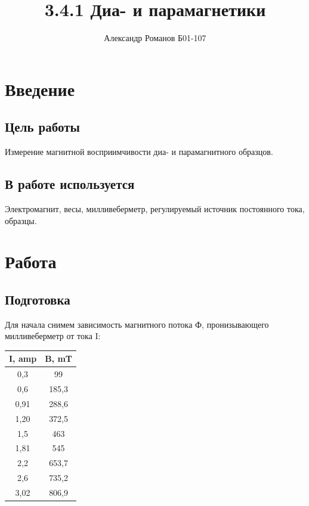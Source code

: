 \documentclass{article}
\author{Александр Романов Б01-107}
\date{}
\title{3.4.1 Диа- и парамагнетики}
\begin{document}
\maketitle

\section{Введение}

    \subsection{Цель работы}
    Измерение магнитной восприимчивости диа- и парамагнитного образцов.

    \subsection{В работе используется}
    Электромагнит, весы, милливеберметр, регулируемый источник постоянного тока, образцы.

\section{Работа}
    \subsection {Подготовка}
    Для начала снимем зависимость магнитного потока Ф, пронизывающего милливеберметр от тока I:

    \begin{table}[H]
        \centering
    \begin{tabular}{|c|c|}
        \hline
        I, amp & B, mT \\\hline
        0,3  & 99     \\\hline
        0,6  & 185,3  \\\hline
        0,91 & 288,6  \\\hline
        1,20 & 372,5  \\\hline
        1,5  & 463    \\\hline
        1,81 & 545    \\\hline
        2,2  & 653,7  \\\hline
        2,6  & 735,2  \\\hline
        3,02 & 806,9  \\\hline
    \end{tabular}
    \end{table}
\end{document}

